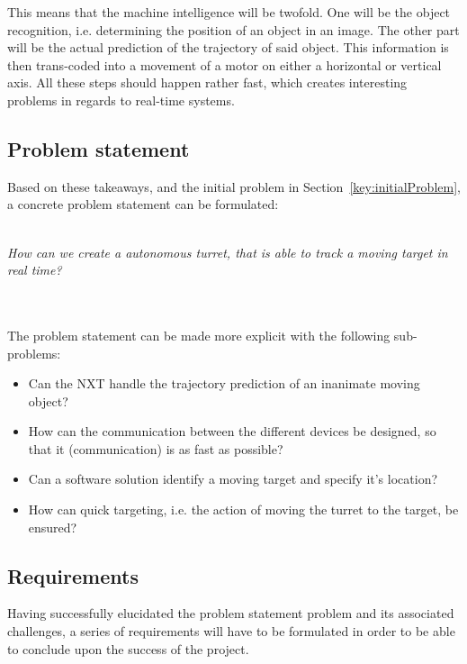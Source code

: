 This means that the machine intelligence will be twofold.
One will be the object recognition, i.e. determining the position of an object in an image.
The other part will be the actual prediction of the trajectory of said object.
This information is then trans-coded into a movement of a motor on either a horizontal or vertical axis.
All these steps should happen rather fast, which creates interesting problems in regards to real-time systems.

\subsection{Problem statement}
Based on these takeaways, and the initial problem in Section~\ref{key:initialProblem}, a concrete problem statement can be formulated:\\~\\
\begin{center}
	
	\textit{\large{How can we create a autonomous turret, that is able to track a moving target in real time?}}
\end{center}~\\~\\

The problem statement can be made more explicit with the following sub-problems:
\begin{center}
	\begin{itemize}
		\item Can the NXT handle the trajectory prediction of an inanimate moving object?
		\item How can the communication between the different devices be designed, so that it (communication) is as fast as possible? 
		\item Can a software solution identify a moving target and specify it's location?
		\item How can quick targeting, i.e. the action of moving the turret to the target, be ensured?
	\end{itemize}
\end{center}


\subsection{Requirements}
Having successfully elucidated the problem statement problem and its associated challenges, a series  of requirements will have to be formulated in order to be able to conclude upon the success of the project.

